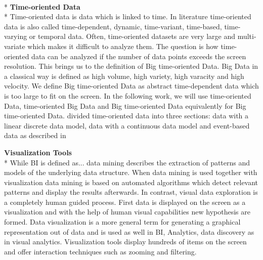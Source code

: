 \\*
\textbf{Time-oriented Data}\\*
Time-oriented data is data which is linked to time\cite{Aigner2011}. In literature time-oriented data is also called time-dependent, dynamic, time-variant, time-based, time-varying or temporal data\cite{Moere2004}. Often, time-oriented datasets are very large and multi-variate which makes it difficult to analyze them. The question is how time-oriented data can be analyzed if the number of data points exceeds the screen resolution. This brings us to the definition of Big time-oriented Data.
Big Data in a classical way is defined as high volume, high variety, high varacity and high velocity\cite{PhilipChen2014}.
We define Big time-oriented Data as abstract time-dependent data which is too large to fit on the screen. \cite{Shneiderman2008} 
In the following work, we will use time-oriented Data, time-oriented Big Data and Big time-oriented Data equivalently for Big time-oriented Data.
\cite{Bacic2013} divided time-oriented data into three sections: data with a linear discrete data model, data with a continuous data model and event-based data as described in \cite{Bacic2013} 




\textbf{Visualization Tools}\\*
While BI is defined as... data mining describes the extraction of patterns and models of the underlying data structure\cite{FerreiradeOliveira2003}. When data mining is used together with visualization data mining is based on automated algorithms which detect relevant patterns and display the results afterwards. In contrast, visual data exploration is a completely human guided process\cite{FerreiradeOliveira2003}. First data is displayed on the screen as a visualization and with the help of human visual capabilities new hypothesis are formed. Data visualization is a more general term for generating a graphical representation out of data and is used as well in BI, Analytics, data discovery as in visual analytics. 
Visualization tools display hundreds of items on the screen and offer interaction techniques such as zooming and filtering\cite{Shneiderman2008}.



